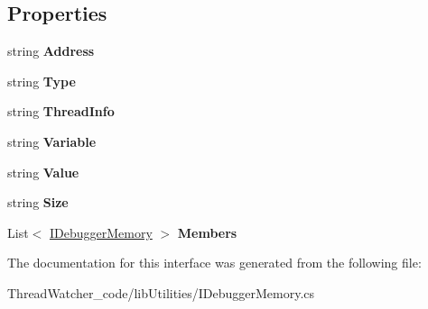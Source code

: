 \subsection*{Properties}
\begin{DoxyCompactItemize}
\item 
\hypertarget{interfacelib_utilities_1_1_i_debugger_memory_a51fb46f4c8925c74f1979a5dc8227a4b}{string {\bfseries Address}}\label{interfacelib_utilities_1_1_i_debugger_memory_a51fb46f4c8925c74f1979a5dc8227a4b}

\item 
\hypertarget{interfacelib_utilities_1_1_i_debugger_memory_af5c4e61702ba255bed6d02ef16a0fef0}{string {\bfseries Type}}\label{interfacelib_utilities_1_1_i_debugger_memory_af5c4e61702ba255bed6d02ef16a0fef0}

\item 
\hypertarget{interfacelib_utilities_1_1_i_debugger_memory_ac11ed71a852ba10a6dbee5c86c02901b}{string {\bfseries Thread\+Info}}\label{interfacelib_utilities_1_1_i_debugger_memory_ac11ed71a852ba10a6dbee5c86c02901b}

\item 
\hypertarget{interfacelib_utilities_1_1_i_debugger_memory_ad2eb5f32524d8c09adf983c8417baf83}{string {\bfseries Variable}}\label{interfacelib_utilities_1_1_i_debugger_memory_ad2eb5f32524d8c09adf983c8417baf83}

\item 
\hypertarget{interfacelib_utilities_1_1_i_debugger_memory_aad64c265527e8ba8335dd4d69495eb46}{string {\bfseries Value}}\label{interfacelib_utilities_1_1_i_debugger_memory_aad64c265527e8ba8335dd4d69495eb46}

\item 
\hypertarget{interfacelib_utilities_1_1_i_debugger_memory_aa0ebd244494f5fa358b7b237f184004d}{string {\bfseries Size}}\label{interfacelib_utilities_1_1_i_debugger_memory_aa0ebd244494f5fa358b7b237f184004d}

\item 
\hypertarget{interfacelib_utilities_1_1_i_debugger_memory_a67a5ab452ec45bfec4c0cff82cbc5c6d}{List$<$ \hyperlink{interfacelib_utilities_1_1_i_debugger_memory}{I\+Debugger\+Memory} $>$ {\bfseries Members}}\label{interfacelib_utilities_1_1_i_debugger_memory_a67a5ab452ec45bfec4c0cff82cbc5c6d}

\end{DoxyCompactItemize}


The documentation for this interface was generated from the following file\+:\begin{DoxyCompactItemize}
\item 
Thread\+Watcher\+\_\+code/lib\+Utilities/I\+Debugger\+Memory.\+cs\end{DoxyCompactItemize}
